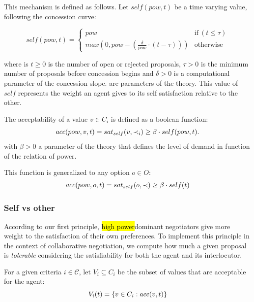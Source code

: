 \documentclass{llncs}
\begin{document}
	 
	 This mechanism is defined as follows. Let $self(pow, t)$ be a time varying value, following the concession curve:
	 
	 \begin{equation}
	 self(pow, t) = \left\{\begin{array}{ll}
	 pow & \mathrm{if\ } (t \leq \tau)\\
	 max(0, pow - (\frac{\delta}{pow} \cdot (t - \tau))) & \mathrm{otherwise}
	 \end{array}\right.
	 \end{equation}
	 
	 where is $t \geq 0$ is the number of open or rejected proposals, $\tau > 0$ is the minimum number of proposals before concession begins and $\delta > 0$ is a computational parameter of the concession slope.
	 are parameters of the theory. This value of $self$ represents the weight an agent gives to its self satisfaction relative to the other.
	 
	 The acceptability of a value $v \in C_i$ is defined as a boolean function:
	 	 	\vspace{-.5em} 
	 \begin{equation}
	 \vspace{-.5em} 
	 acc(pow,v, t) = sat_{self}(v, \prec_i) \geq  \beta \cdot self(pow,t).
	 \end{equation}
	 with $\beta>0$ a parameter of the theory that defines the level of demand in function of the relation of power.
	 
	 This function is generalized to any option $o \in O$:
	 	\vspace{-.5em} 
	 \begin{equation}
	 acc(pow,o, t) = sat_{self}(o, \prec) \geq  \beta \cdot self(t)
	 	\vspace{-1.5em} 
	 \end{equation}

	\subsubsection {Self vs other}
	According to our first principle, \hl{high power}dominant negotiators give more weight to the satisfaction of their own preferences. To implement this principle in the context of collaborative negotiation, we compute how much a given proposal is \emph{tolerable} considering the satisfiability for both the agent and its interlocutor.
	
	For a given criteria $i\in\mathcal{C}$, let $V_i\subseteq C_i$ be the subset of values that are acceptable for the agent:
	\vspace{-1em} 
	\begin{equation}
	V_i(t) = \{ v\in C_i : acc(v,t) \}
		\vspace{-0.5em} 
	\end{equation}
	
\end{document}
